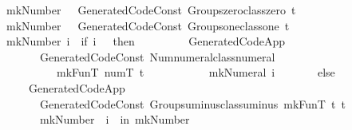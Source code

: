 \begin{isabellebody}
\ \ \ \ \ mkNumber\ {}\ {\isacharequal}{\kern0pt}\ Generated{\isacharprime}{\kern0pt}{\isacharunderscore}{\kern0pt}Code{\isachardot}{\kern0pt}Const\ {\isachardoublequote}{\kern0pt}Groups{\isachardot}{\kern0pt}zero{\isacharprime}{\kern0pt}{\isacharunderscore}{\kern0pt}class{\isachardot}{\kern0pt}zero{\isachardoublequote}{\kern0pt}\ t{\isacharsemicolon}{\kern0pt}\isanewline
\ \ \ \ \ mkNumber\ {}\ {\isacharequal}{\kern0pt}\ Generated{\isacharprime}{\kern0pt}{\isacharunderscore}{\kern0pt}Code{\isachardot}{\kern0pt}Const\ {\isachardoublequote}{\kern0pt}Groups{\isachardot}{\kern0pt}one{\isacharprime}{\kern0pt}{\isacharunderscore}{\kern0pt}class{\isachardot}{\kern0pt}one{\isachardoublequote}{\kern0pt}\ t{\isacharsemicolon}{\kern0pt}\isanewline
\ \ \ \ \ mkNumber\ i\ {\isacharequal}{\kern0pt}\ if\ i\ {\isachargreater}{\kern0pt}\ {}\ then\isanewline
\ \ \ \ \ \ \ \ \ Generated{\isacharprime}{\kern0pt}{\isacharunderscore}{\kern0pt}Code{\isachardot}{\kern0pt}App\isanewline
\ \ \ \ \ \ \ \ \ \ \ {\isacharparenleft}{\kern0pt}Generated{\isacharprime}{\kern0pt}{\isacharunderscore}{\kern0pt}Code{\isachardot}{\kern0pt}Const\ {\isachardoublequote}{\kern0pt}Num{\isachardot}{\kern0pt}numeral{\isacharprime}{\kern0pt}{\isacharunderscore}{\kern0pt}class{\isachardot}{\kern0pt}numeral{\isachardoublequote}{\kern0pt}\isanewline
\ \ \ \ \ \ \ \ \ \ \ \ \ \ {\isacharparenleft}{\kern0pt}mkFunT\ numT\ t{\isacharparenright}{\kern0pt}{\isacharparenright}{\kern0pt}\isanewline
\ \ \ \ \ \ \ \ \ \ \ {\isacharparenleft}{\kern0pt}mkNumeral\ i{\isacharparenright}{\kern0pt}\isanewline
\ \ \ \ \ \ \ else\isanewline
\ \ \ \ \ \ \ \ \ Generated{\isacharprime}{\kern0pt}{\isacharunderscore}{\kern0pt}Code{\isachardot}{\kern0pt}App\isanewline
\ \ \ \ \ \ \ \ \ \ \ {\isacharparenleft}{\kern0pt}Generated{\isacharprime}{\kern0pt}{\isacharunderscore}{\kern0pt}Code{\isachardot}{\kern0pt}Const\ {\isachardoublequote}{\kern0pt}Groups{\isachardot}{\kern0pt}uminus{\isacharprime}{\kern0pt}{\isacharunderscore}{\kern0pt}class{\isachardot}{\kern0pt}uminus{\isachardoublequote}{\kern0pt}\ {\isacharparenleft}{\kern0pt}mkFunT\ t\ t{\isacharparenright}{\kern0pt}{\isacharparenright}{\kern0pt}\isanewline
\ \ \ \ \ \ \ \ \ \ \ {\isacharparenleft}{\kern0pt}mkNumber\ {\isacharparenleft}{\kern0pt}{\isacharminus}{\kern0pt}\ i{\isacharparenright}{\kern0pt}{\isacharparenright}{\kern0pt}{\isacharsemicolon}{\kern0pt}\ {\isacharbraceright}{\kern0pt}\ in\ mkNumber{\isacharparenright}{\kern0pt}{\isachardoublequoteclose}%
\isadelimdocument
%
\endisadelimdocument
%
\isatagdocument
%
\end{isabellebody}
